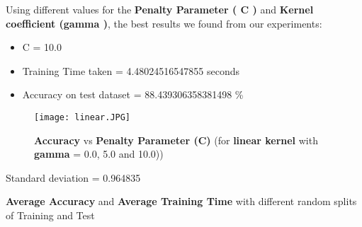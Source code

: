\documentclass{beamer}
\begin{document}
\begin{frame}[t, allowframebreaks]
\begin{vwcol}[widths={6.5,3.0}, sep=.8cm, justify=flush, rule=0pt, indent=1em]
\begin{minipage}{0.3\linewidth}
Using different values for the
\textbf{Penalty Parameter ( C )} and
\textbf{Kernel coefficient (gamma )},
the best results we found from
our experiments:\
\begin{itemize}
\item C = 10.0
\item Training Time taken =
4.48024516547855 seconds
\item Accuracy on test dataset =
88.439306358381498 \%
\end{itemize}

\end{minipage}
\end{vwcol}


\begin{figure}[!h]
  \texttt{[image: linear.JPG]}
  \caption*{\tiny \textbf{Accuracy }vs\textbf{ Penalty Parameter (C)} (for \textbf{linear kernel} with \textbf{gamma} = 0.0, 5.0 and 10.0))}
  \label{fig:}
\end{figure}
\begin{exampleblock}
\LARGE
Standard deviation = 0.964835
\end{exampleblock}
\pagebreak
\fontsize{8}{9.6}\selectfont
{\textbf{Average Accuracy} and \textbf{Average Training Time} with different random splits of Training and Test}
\linebreak

\begin{vwcol}[widths={6.5,3.0}, sep=.8cm, justify=flush, rule=0pt, indent=1em]
\begin{minipage}{0.7\linewidth}


\end{minipage}
\end{vwcol}
\end{frame}
\end{document}
